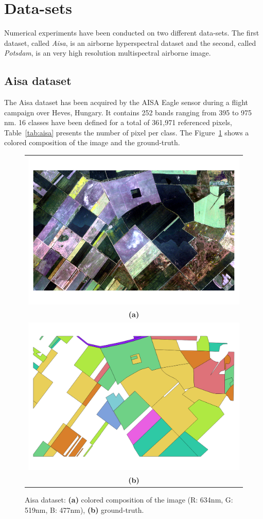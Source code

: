 \documentclass[journal]{IEEEtran}
\begin{document}
\section{Data-sets}
\label{sec:datasets}
Numerical experiments  have been conducted on  two different data-sets.
The first  dataset, called  \emph{Aisa}, is an  airborne hyperspectral
dataset  and  the  second,  called \emph{Potsdam},  is  an  very  high
resolution multispectral airborne image.

    \subsection{Aisa dataset}
    \label{sec:aisa-dataset}
    The Aisa dataset has been acquired by the AISA Eagle sensor during
    a  flight campaign  over Heves,  Hungary.  It  contains 252  bands
    ranging from  395 to 975  nm. 16 classes  have been defined  for a
    total of 361,971  referenced pixels, Table~\ref{tab:aisa} presents
    the number of pixel per  class.  The Figure~\ref{fig:aisa} shows a
    colored composition of the image and the ground-truth.

    \begin{figure}[!t]
        \centering
        \begin{tabular}{c}
            \includegraphics[width=0.7\columnwidth]{Fig/aisa.png} \\
            {\bfseries{(a)}} \\
            \includegraphics[width=0.7\columnwidth]{Fig/aisa_gt.png} \\
            {\bfseries{(b)}} \\
        \end{tabular}
        \caption{Aisa dataset: {\bfseries{(a)}} colored composition of the image (R: 634nm, G: 519nm, B: 477nm), {\bfseries{(b)}} ground-truth.\label{fig:aisa}}
    \end{figure}
\end{document}
